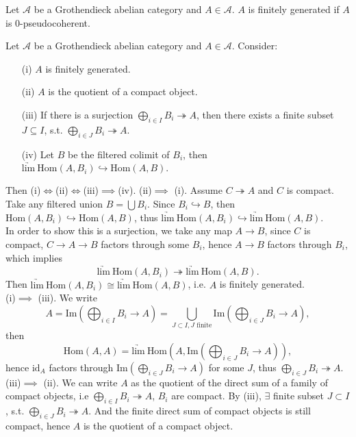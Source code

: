 \documentclass[UTF8,12,a4paper]{ctexart}
\theoremstyle{definition}
\begin{document}
\dfn 
Let $\mathcal{A}$ be a Grothendieck abelian category and $A\in\mathcal{A}$. $A$ is finitely generated if $A$ is 0-pseudocoherent. 




\lem 
Let $\mathcal{A}$ be a Grothendieck abelian category and $A\in\mathcal{A}$. Consider:
\begin{itemize}
	\item [(i)]
	$A$ is finitely generated.
	\item [(ii)] $A$ is the quotient of a compact object.
	\item [(iii)] If there is a surjection $\bigoplus_{i\in I} B_i\twoheadrightarrow A$, then there exists a finite subset $J\subseteq I$, s.t. $\bigoplus_{i\in J} B_i\twoheadrightarrow A.$
	\item [(iv)] Let $B$ be the filtered colimit of $B_i$, then $\underrightarrow{\text{lim}}\ \text{Hom}(A, B_i)\hookrightarrow \text{Hom}(A,B).$
\end{itemize}
Then (i)$\iff$(ii)$\iff$(iii)$\implies$(iv).
\pf 
(ii)$\implies$ (i). Assume $C\twoheadrightarrow A$ and $C$ is compact. Take any filtered union $B=\bigcup B_i$. Since $B_i\hookrightarrow B$, then $\text{Hom}(A,B_i)\hookrightarrow \text{Hom}(A,B)$, thus $\underrightarrow{\text{lim}}\ \text{Hom}(A,B_i)\hookrightarrow \underrightarrow{\text{lim}}\ \text{Hom}(A,B)$. \\
In order to show this is a surjection, we take any map $A\rightarrow B$, since $C$ is compact, $C\rightarrow A\rightarrow B$ factors through some $B_i$, hence $A\rightarrow B$ factors through $B_i$, which implies
$$
\underrightarrow{\text{lim}}\ \text{Hom}(A,B_i)\twoheadrightarrow \underrightarrow{\text{lim}}\ \text{Hom}(A,B).
$$
Then $\underrightarrow{\text{lim}}\ \text{Hom}(A,B_i)\cong  \underrightarrow{\text{lim}}\ \text{Hom}(A,B)$, i.e. $A$ is finitely generated.\\
(i)$\implies$ (iii). We write 
$$A=\text{Im}(\bigoplus_{i\in I}B_i\rightarrow A)=\bigcup_{J\subset I, J\text{ finite}} \text{Im}(\bigoplus_{i\in J}B_i\rightarrow A),$$
then
$$
\text{Hom}(A,A)=\underrightarrow{\text{lim}}\ \text{Hom}(A, \text{Im}(\bigoplus_{i\in J}B_i\rightarrow A)),
$$
hence $\text{id}_A$ factors through $ \text{Im}(\bigoplus_{i\in J}B_i\rightarrow A)$ for some $J$, thus $\bigoplus_{i\in J}B_i\twoheadrightarrow A.$\\
(iii)$\implies$ (ii).
We can write $A$ as the quotient of the direct sum of a family of compact objects, i.e $\bigoplus_{i\in I} B_i\twoheadrightarrow A$, $B_i$ are compact. By (iii), $\exists$ finite subset $J\subset I$, s.t. $\bigoplus_{i\in J} B_i\twoheadrightarrow A$. And the finite direct sum of compact objects is still compact, hence $A$ is the quotient of a compact object.\\
\end{document}
